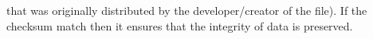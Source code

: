 that was originally distributed by the developer/creator of the file). If the
checksum match then it ensures that the integrity of data is preserved.

